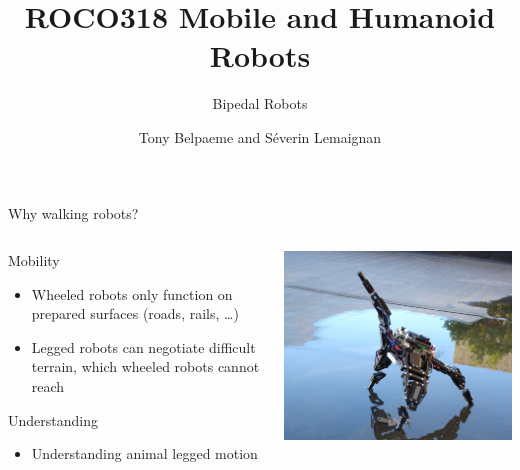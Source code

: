 \documentclass[compress]{beamer}
\title{ROCO318 \newline Mobile and Humanoid Robots}
\subtitle{Bipedal Robots}
\date{}
\author{Tony Belpaeme and Séverin Lemaignan}
\institute{Centre for Neural Systems and Robotics\\{\bf Plymouth University}}
\begin{document}

\maketitle


\begin{frame}{Why walking robots?}
    \begin{columns}
        \begin{column}{0.5\linewidth}
    Mobility

    \begin{itemize}

        \item Wheeled robots only function on prepared surfaces (roads, rails, \ldots{})
        \item Legged robots can negotiate difficult terrain, which wheeled robots
            cannot reach
    \end{itemize}

    Understanding

    \begin{itemize}

        \item Understanding animal legged motion
    \end{itemize}
            
        \end{column}
        \begin{column}{0.5\linewidth}
            \begin{center}
                \includegraphics[width=0.8\linewidth]{image1}


\end{center}
\end{column}
\end{columns}
\end{frame}
\end{document}
